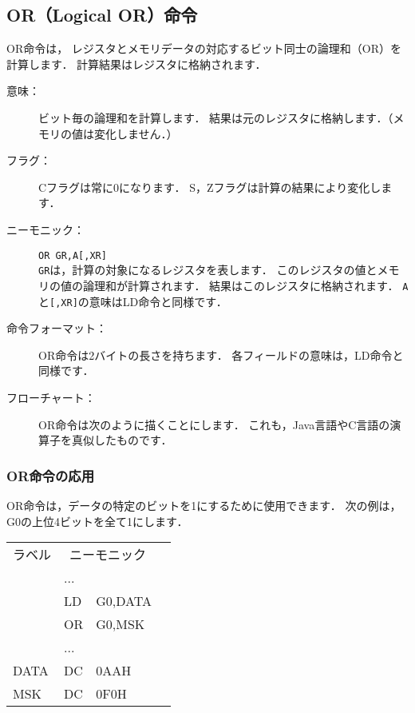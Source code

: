 \newpage
\subsection{OR（Logical OR）命令}
OR命令は，
レジスタとメモリデータの対応するビット同士の論理和（OR）を計算します．
計算結果はレジスタに格納されます．

\begin{description}
\item[意味：]ビット毎の論理和を計算します．
結果は元のレジスタに格納します．（メモリの値は変化しません．）

\item[フラグ：]Cフラグは常に0になります．
S，Zフラグは計算の結果により変化します．

\item[ニーモニック：]{\tt OR  GR,A[,XR]} \\
{\tt GR}は，計算の対象になるレジスタを表します．
このレジスタの値とメモリの値の論理和が計算されます．
結果はこのレジスタに格納されます．
{\tt A}と{\tt [,XR]}の意味はLD命令と同様です．

\item[命令フォーマット：]OR命令は2バイトの長さを持ちます．
各フィールドの意味は，LD命令と同様です．


\item[フローチャート：]OR命令は次のように描くことにします．
これも，Java言語やC言語の演算子を真似したものです．

\begin{center}
\end{center}

\end{description}

\subsubsection{OR命令の応用}
OR命令は，データの特定のビットを1にするために使用できます．
次の例は，G0の上位4ビットを全て1にします．

{\tt\small\begin{center}
\begin{tabular}{|l|l l|l}
\cline{1-3}
ラベル & \multicolumn{2}{|c|}{ニーモニック} & \\
\cline{1-3}
    & ...  &        & \\
    & LD   & G0,DATA& \\
    & OR   & G0,MSK & \\
    & ...  &        & \\
DATA& DC   & 0AAH    & \\
MSK & DC   & 0F0H    & \\
\cline{1-3}
\end{tabular}
\end{center}}

